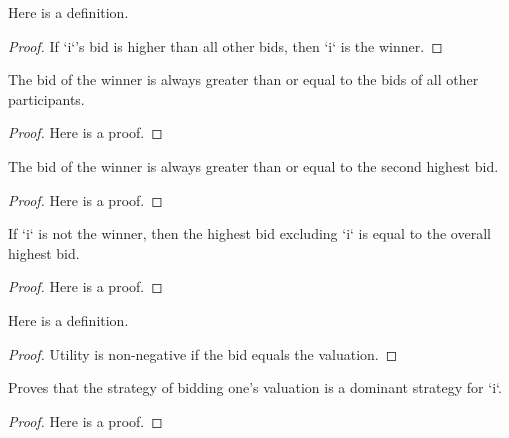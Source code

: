 \begin{lemma}\label{gt_wins}
    \leanok
    Here is a definition.
\end{lemma}
\begin{proof}
    If `i`'s bid is higher than all other bids, then `i` is the winner.
\end{proof}



\begin{lemma}\label{b_winner_max}
    \leanok
    The bid of the winner is always greater than or equal to the bids of all other participants.
\end{lemma}
\begin{proof}
    Here is a proof.
\end{proof}

\begin{lemma}\label{b_winner}
    \leanok
    The bid of the winner is always greater than or equal to the second highest bid.
\end{lemma}
\begin{proof}
    Here is a proof.
\end{proof}

\begin{lemma}\label{b_loser_max}
    \leanok
    If `i` is not the winner, then the highest bid excluding `i` is equal to the overall highest bid.
\end{lemma}
\begin{proof}
    Here is a proof.
\end{proof}

\begin{lemma}\label{utility_nneg}
    \leanok
    Here is a definition.
\end{lemma}
\begin{proof}
    Utility is non-negative if the bid equals the valuation.
\end{proof}

\begin{lemma}\label{valuation_is_dominant}
    \leanok
          Proves that the strategy of bidding one's valuation is a dominant strategy for `i`.
\end{lemma}
\begin{proof}
    Here is a proof.
\end{proof}


